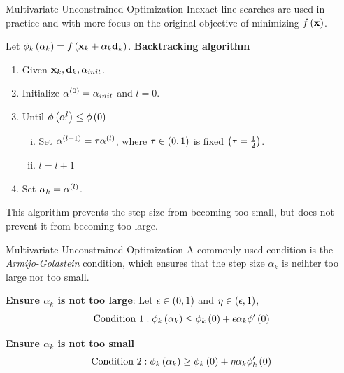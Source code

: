 \documentclass[aspectratio=169]{beamer}
\let\olditem\item
\renewcommand{\item}{\setlength{\itemsep}{\fill}\olditem}
\def\mf{\ensuremath\mathbf}
\def\lp{\ensuremath\left(}
\def\rp{\ensuremath\right)}
\newcommand{\ct}[1]{\lp #1\rp}
\begin{document}
\begin{frame} {Multivariate Unconstrained Optimization} 
  Inexact line searches are used in practice and with more focus on the original objective of minimizing $f\ct{\mf{x}}$.
  \vspace{0.25cm}
  
  Let $\phi_k\ct{\alpha_k} = f\ct{\mf{x}_k + \alpha_k \mf{d}_k}$.
  \textbf{Backtracking algorithm}
  \begin{enumerate}[(1)]
    \item Given $\mf{x}_k, \mf{d}_k, \alpha_{init}$.
    \item Initialize $\alpha^{\ct{0}} = \alpha_{init}$ and $l = 0$.
    \item Until $\phi\ct{\alpha^{l}} \leq \phi\ct{0}$
      \begin{enumerate}[(i)]
        \item Set $\alpha^{\ct{l+1}} = \tau \alpha^{\ct{l}}$, where $\tau \in \ct{0, 1}$ is fixed $\ct{\tau = \frac{1}{2}}$.
        \item $l = l + 1$
      \end{enumerate}
    \item Set $\alpha_k = \alpha^{\ct{l}}$.
  \end{enumerate}

  This algorithm prevents the step size from becoming too small, but does not prevent it from becoming too large.
\end{frame}


\begin{frame} {Multivariate Unconstrained Optimization} 
  A  commonly used condition is the \textit{Armijo-Goldstein} condition, which ensures that the step size $\alpha_k$ is neihter too large nor too small.
  \vspace{0.2cm}

  \textbf{Ensure $\alpha_k$ is not too large}: Let $\epsilon \in \ct{0, 1}$ and $\eta \in \ct{\epsilon, 1}$,
  \[ \text{Condition 1}: \phi_k\ct{\alpha_k} \leq \phi_k\ct{0} + \epsilon \alpha_k \phi'\ct{0} \]

  \textbf{Ensure $\alpha_k$ is not too small}
  \[ \text{Condition 2}: \phi_k\ct{\alpha_k} \geq \phi_k\ct{0} + \eta \alpha_k \phi_k'\ct{0} \]
\end{frame}
\end{document}
